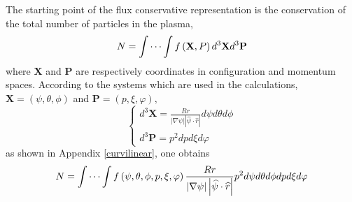 
\label{fluxcons}The starting point of the flux conservative
representation is the conservation of the total number of particles
in the plasma,
\begin{equation}
N=\idotsint f\left( \mathbf{X},P\right) d^{3}\mathbf{X}d^{3}\mathbf{P}
\end{equation}
where $\mathbf{X}$ and $\mathbf{P}$ are respectively coordinates in
configuration and momentum spaces. According to the systems which are used
in the calculations, $\mathbf{X=}\left( \psi ,\theta ,\phi \right) $ and $%
\mathbf{P=}\left( p,\xi ,\varphi \right) ,$%
\begin{equation}
\left\{
\begin{array}{l}
d^{3}\mathbf{X=}\frac{Rr}{\left| \nabla \psi \right| \left| \widehat{\psi }%
\cdot \widehat{r}\right| }d\psi d\theta d\phi  \\
d^{3}\mathbf{P=}p^{2}dpd\xi d\varphi
\end{array}
\right.
\end{equation}
as shown in Appendix \ref{curvilinear}, one obtains
\begin{equation}
N=\idotsint f\left( \psi ,\theta ,\phi ,p,\xi ,\varphi \right) \frac{Rr}{%
\left| \nabla \psi \right| \left| \widehat{\psi }\cdot \widehat{r}\right| }%
p^{2}d\psi d\theta d\phi dpd\xi d\varphi
\end{equation}


